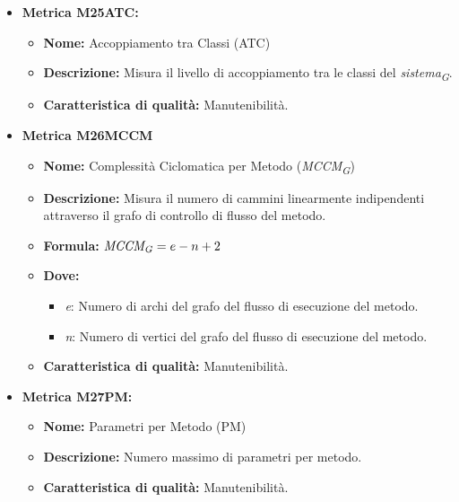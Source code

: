 \begin{itemize}
            \item \hypertarget{item:M25ATC}{\textbf{Metrica M25ATC:}}
            \begin{minipage}[t]{0.9\textwidth}
                  \begin{itemize}
                      \item \textbf{Nome:} Accoppiamento tra Classi (ATC)
                      \item \textbf{Descrizione:} Misura il livello di accoppiamento tra le classi del \textit{sistema}\textsubscript{\textit{G}}.
                      \item \textbf{Caratteristica di qualità:} Manutenibilità.
                  \end{itemize}
                \end{minipage}

        \item \hypertarget{item:M26MCCM}{\textbf{Metrica M26MCCM}}
        \begin{minipage}[t]{0.9\textwidth}
            \begin{itemize}
            \item \textbf{Nome:} Complessità Ciclomatica per Metodo (\textit{MCCM}\textsubscript{\textit{G}})
            \item \textbf{Descrizione:} Misura il numero di cammini linearmente indipendenti attraverso il grafo di controllo di flusso del metodo.
            \item \textbf{Formula:} $\textit{MCCM}\textsubscript{\textit{G}} = e - n + 2$
            \item \textbf{Dove:}
            \begin{itemize}
                        \item \textit{e}: Numero di archi del grafo del flusso di esecuzione del metodo.
                        \item \textit{n}: Numero di vertici del grafo del flusso di esecuzione del metodo.
            \end{itemize}
            \item \textbf{Caratteristica di qualità:} Manutenibilità.
         \end{itemize}
        \end{minipage}

        \item \hypertarget{item:M27PM}{\textbf{Metrica M27PM:}}
        \begin{minipage}[t]{0.9\textwidth}
        \begin{itemize}
            \item \textbf{Nome:} Parametri per Metodo (PM)
            \item \textbf{Descrizione:} Numero massimo di parametri per metodo.
            \item \textbf{Caratteristica di qualità:} Manutenibilità.
          \end{itemize}
        \end{minipage}


\end{itemize}
